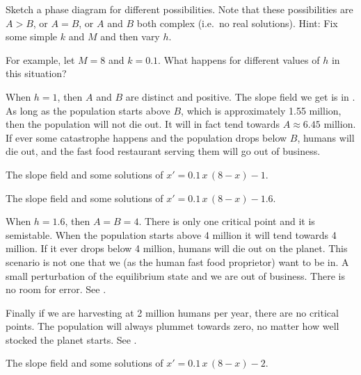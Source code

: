 \documentclass{ximera}
\begin{document}
\begin{exercise}
    Sketch a phase diagram for different possibilities.  Note that these possibilities are $A > B$, or $A=B$, or $A$ and $B$ both complex (i.e.\ no real solutions).  Hint: Fix some simple $k$ and $M$ and then vary $h$.
\end{exercise}

\begin{example} 
    For example, let $M=8$ and $k=0.1$. What happens for different values of $h$ in this situation?
\end{example}

\begin{exampleSol}
    When $h=1$, then $A$ and $B$ are distinct and positive. The slope field we get is in .  As long as the population starts above $B$, which is approximately 1.55 million, then the population will not die out.  It will in fact tend towards $A \approx 6.45$ million.  If ever some catastrophe happens and the population drops below $B$, humans will die out, and the fast food restaurant serving them will go out of business.
    
    \begin{myfig}
        \parbox[t]{3.0in}{
         \capstart
         \caption{The slope field and some solutions of
         $x' = 0.1\,x\,(8-x)-1$.\label{2.2:harv1}}
        }
        \quad
        \parbox[t]{3.0in}{
         \capstart
         \caption{The slope field and some solutions of
         $x' = 0.1\,x\,(8-x)-1.6$.\label{2.2:harvc}}
        }
    \end{myfig}
    
    When $h = 1.6$, then $A=B=4$.  There is only one critical point and it is semistable.  When the population starts above 4 million it will tend towards 4 million.  If it ever drops below 4 million, humans will die out on the planet.  This scenario is not one that we (as the human fast food proprietor)  want to be in.  A small perturbation of the equilibrium state and we are out of business. There is no room for error.  See .
    
    Finally if we are harvesting at 2 million humans per year, there are no critical points. The population will always plummet towards zero, no matter how well stocked the planet starts.  See .
    
    \begin{myfig}
        \capstart
        \caption{The slope field and some solutions of
        $x' = 0.1\,x\,(8-x)-2$.\label{2.2:harv2}}
    \end{myfig}
    

\end{exampleSol}
\end{document}

